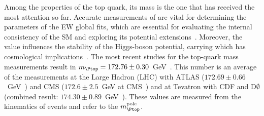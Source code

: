 Among the properties of the top quark, its mass is the one that has received the most attention so far.
Accurate measurements of \mtop are vital for determining the parameters of the EW global fits, which are essential for evaluating the internal consistency of the SM and exploring its potential extensions~\cite{ALEPH:2010aa, Baak:2014ora}. Moreover, the \mtop value influences the stability of the Higgs-boson potential, carrying which has cosmological implications~\cite{Degrassi:2012ry, Bezrukov:2007ep, DeSimone:2008ei}.
The most recent studies for the top-quark mass measurements result in $\mtop = 172.76 \pm 0.30$~GeV~\cite{Workman:2022ynf}. %
This number is an average of the measurements at the Large Hadron (LHC) 
with ATLAS ($172.69 \pm 0.66$~GeV~\cite{ATLAS:2018fwq})
and CMS ($172.6 \pm 2.5$~GeV at CMS~\cite{CMS:2019fak}) 
and at Tevatron with CDF and D$\emptyset$ (combined result: $174.30 \pm 0.89$~GeV~\cite{CDF:2016vzt}).
These values are measured from the kinematics of  \ttbar events and refer to the $\mtop^{\text{pole}}$.%
 






